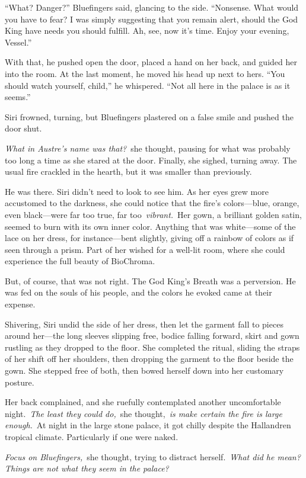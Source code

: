 “What? Danger?” Bluefingers said, glancing to the side. “Nonsense. What would you have to fear? I was simply suggesting that you remain alert, should the God King have needs you should fulfill. Ah, see, now it’s time. Enjoy your evening, Vessel.”

With that, he pushed open the door, placed a hand on her back, and guided her into the room. At the last moment, he moved his head up next to hers. “You should watch yourself, child,” he whispered. “Not all here in the palace is as it seems.”

Siri frowned, turning, but Bluefingers plastered on a false smile and pushed the door shut.

\textit{What in Austre’s name was that?}~she thought, pausing for what was probably too long a time as she stared at the door. Finally, she sighed, turning away. The usual fire crackled in the hearth, but it was smaller than previously.

He was there. Siri didn’t need to look to see him. As her eyes grew more accustomed to the darkness, she could notice that the fire’s colors—blue, orange, even black—were far too true, far too~\textit{vibrant.}~Her gown, a brilliant golden satin, seemed to burn with its own inner color. Anything that was white—some of the lace on her dress, for instance—bent slightly, giving off a rainbow of colors as if seen through a prism. Part of her wished for a well-lit room, where she could experience the full beauty of BioChroma.

But, of course, that was not right. The God King’s Breath was a perversion. He was fed on the souls of his people, and the colors he evoked came at their expense.

Shivering, Siri undid the side of her dress, then let the garment fall to pieces around her—the long sleeves slipping free, bodice falling forward, skirt and gown rustling as they dropped to the floor. She completed the ritual, sliding the straps of her shift off her shoulders, then dropping the garment to the floor beside the gown. She stepped free of both, then bowed herself down into her customary posture.

Her back complained, and she ruefully contemplated another uncomfortable night.~\textit{The least they could do,}~she thought,~\textit{is make certain the fire is large enough.}~At night in the large stone palace, it got chilly despite the Hallandren tropical climate. Particularly if one were naked.

\textit{Focus on Bluefingers,}~she thought, trying to distract herself.~\textit{What did he mean? Things are not what they seem in the palace?}

